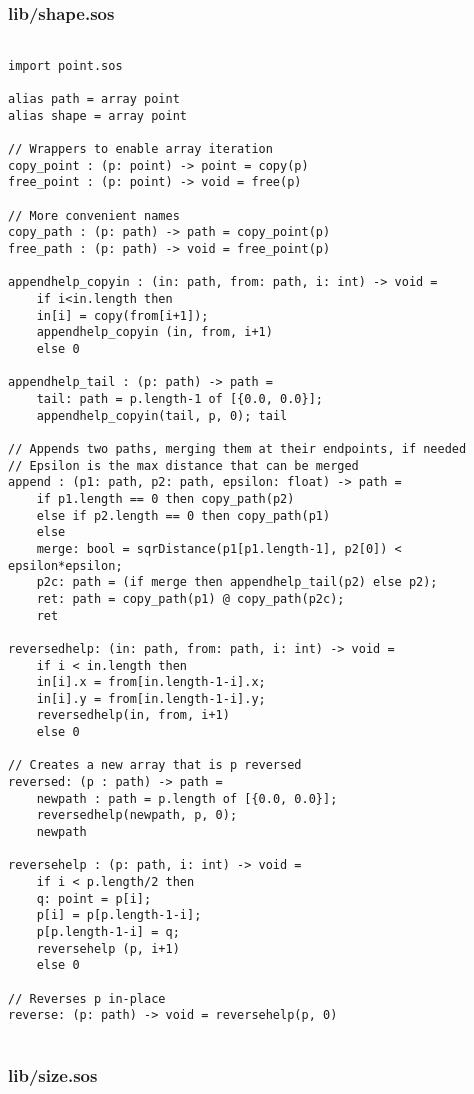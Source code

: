 \documentclass[main.tex]{subfiles}
\begin{document}
\subsubsection{lib/shape.sos}

\begin{lstlisting}

import point.sos

alias path = array point
alias shape = array point

// Wrappers to enable array iteration
copy_point : (p: point) -> point = copy(p)
free_point : (p: point) -> void = free(p)

// More convenient names
copy_path : (p: path) -> path = copy_point(p)
free_path : (p: path) -> void = free_point(p)

appendhelp_copyin : (in: path, from: path, i: int) -> void = 
    if i<in.length then
    in[i] = copy(from[i+1]);
    appendhelp_copyin (in, from, i+1)
    else 0

appendhelp_tail : (p: path) -> path = 
    tail: path = p.length-1 of [{0.0, 0.0}];
    appendhelp_copyin(tail, p, 0); tail

// Appends two paths, merging them at their endpoints, if needed
// Epsilon is the max distance that can be merged
append : (p1: path, p2: path, epsilon: float) -> path = 
    if p1.length == 0 then copy_path(p2)
    else if p2.length == 0 then copy_path(p1)
    else 
    merge: bool = sqrDistance(p1[p1.length-1], p2[0]) < epsilon*epsilon;
    p2c: path = (if merge then appendhelp_tail(p2) else p2);
    ret: path = copy_path(p1) @ copy_path(p2c);
    ret

reversedhelp: (in: path, from: path, i: int) -> void = 
    if i < in.length then
    in[i].x = from[in.length-1-i].x;
    in[i].y = from[in.length-1-i].y;
    reversedhelp(in, from, i+1)
    else 0

// Creates a new array that is p reversed
reversed: (p : path) -> path =
    newpath : path = p.length of [{0.0, 0.0}];
    reversedhelp(newpath, p, 0);
    newpath

reversehelp : (p: path, i: int) -> void =
    if i < p.length/2 then
    q: point = p[i];
    p[i] = p[p.length-1-i];
    p[p.length-1-i] = q;
    reversehelp (p, i+1)
    else 0

// Reverses p in-place
reverse: (p: path) -> void = reversehelp(p, 0)
    
\end{lstlisting}

\subsubsection{lib/size.sos}
\end{document}
